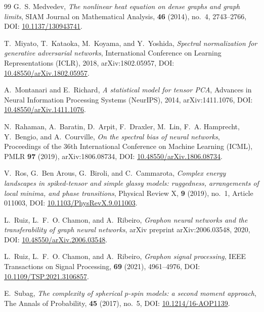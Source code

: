 \documentclass[11pt,a4paper,reqno]{amsart}
\theoremstyle{definition}
\numberwithin{equation}{section}
\begin{document}
\begin{thebibliography}{99}
G.~S. Medvedev,
\emph{The nonlinear heat equation on dense graphs and graph limits},
SIAM Journal on Mathematical Analysis, \textbf{46} (2014), no.~4, 2743--2766, DOI: \href{https://doi.org/10.1137/130943741}{10.1137/130943741}.

T.~Miyato, T.~Kataoka, M.~Koyama, and Y.~Yoshida,
\emph{Spectral normalization for generative adversarial networks},
International Conference on Learning Representations (ICLR), 2018, arXiv:1802.05957, DOI: \href{https://doi.org/10.48550/arXiv.1802.05957}{10.48550/arXiv.1802.05957}.

A.~Montanari and E.~Richard,
\emph{A statistical model for tensor PCA},
Advances in Neural Information Processing Systems (NeurIPS), 2014, arXiv:1411.1076, DOI: \href{https://doi.org/10.48550/arXiv.1411.1076}{10.48550/arXiv.1411.1076}.

N.~Rahaman, A.~Baratin, D.~Arpit, F.~Draxler, M.~Lin, F.~A. Hamprecht, Y.~Bengio, and A.~Courville,
\emph{On the spectral bias of neural networks},
Proceedings of the 36th International Conference on Machine Learning (ICML), PMLR \textbf{97} (2019), arXiv:1806.08734, DOI: \href{https://doi.org/10.48550/arXiv.1806.08734}{10.48550/arXiv.1806.08734}.

V.~Ros, G.~Ben Arous, G.~Biroli, and C.~Cammarota,
\emph{Complex energy landscapes in spiked-tensor and simple glassy models: ruggedness, arrangements of local minima, and phase transitions},
Physical Review X, \textbf{9} (2019), no.~1, Article 011003, DOI: \href{https://doi.org/10.1103/PhysRevX.9.011003}{10.1103/PhysRevX.9.011003}.

L.~Ruiz, L.~F.~O. Chamon, and A.~Ribeiro,
\emph{Graphon neural networks and the transferability of graph neural networks},
arXiv preprint arXiv:2006.03548, 2020, DOI: \href{https://doi.org/10.48550/arXiv.2006.03548}{10.48550/arXiv.2006.03548}.

L.~Ruiz, L.~F.~O. Chamon, and A.~Ribeiro,
\emph{Graphon signal processing},
IEEE Transactions on Signal Processing, \textbf{69} (2021), 4961--4976, DOI: \href{https://doi.org/10.1109/TSP.2021.3106857}{10.1109/TSP.2021.3106857}.

E.~Subag,
\emph{The complexity of spherical $p$-spin models: a second moment approach},
The Annals of Probability, \textbf{45} (2017), no.~5, DOI: \href{https://doi.org/10.1214/16-AOP1139}{10.1214/16-AOP1139}.


\end{thebibliography}
\end{document}
